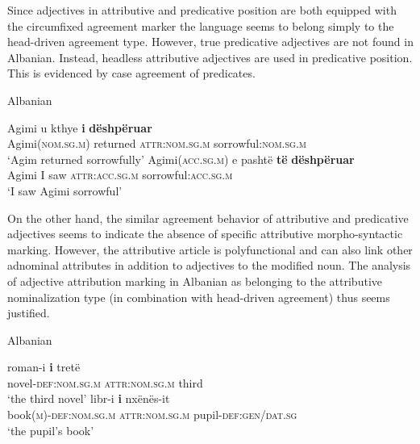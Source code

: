 Since adjectives in attributive and predicative position are both equipped with the circumfixed agreement marker the language seems to belong simply to the head-driven agreement type. However, true predicative adjectives are not found in Albanian. Instead, headless attributive adjectives are used in predicative position. This is evidenced by case agreement of predicates.
\begin{exe}
\ex \rm{Albanian \citep{demiraj1998}}
\begin{xlist}
\ex
\gll	Agimi {u kthye} \textbf{i} \textbf{dëshpëruar}\\
	Agimi(\textsc{nom.sg.m}) returned \textsc{attr:nom.sg.m} sorrowful:\textsc{nom.sg.m}\\
\glt	‘Agim returned sorrowfully’
\ex
\gll	Agimi(\textsc{acc.sg.m}) e pashtë \textbf{të} \textbf{dëshpëruar}\\
	Agimi I saw \textsc{attr:acc.sg.m} sorrowful:\textsc{acc.sg.m}\\
\glt	‘I saw Agimi sorrowful’
\end{xlist}
\end{exe}
On the other hand, the similar agreement behavior of attributive and predicative adjectives seems to indicate the absence of specific attributive morpho-syntactic marking. However, the attributive article is polyfunctional and can also link other adnominal attributes in addition to adjectives to the modified noun. The analysis of adjective attribution marking in Albanian as belonging to the attributive nominalization type (in combination with head-driven agreement) thus seems justified.
\begin{exe}
\ex \rm{Albanian \citep{demiraj1998}}
\begin{xlist}
\ex
\gll	roman-i 			\textbf{i} 			tretë\\
	novel-\textsc{def:nom.sg.m} \textsc{attr:nom.sg.m} third\\
\glt	‘the third novel’
\ex	
\gll	libr-i 	\textbf{i} nxënës-it\\
	book(\textsc{m})-\textsc{def:nom.sg.m} \textsc{attr:nom.sg.m} pupil-\textsc{def:gen/dat.sg}\\
\glt	‘the pupil's book’
\end{xlist}
\end{exe}


